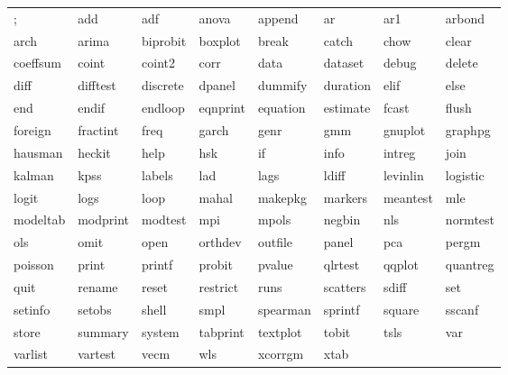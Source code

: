 \begin{tabular}{llllllll}
; & add & adf & anova & append & ar & ar1 & arbond \\
arch & arima & biprobit & boxplot & break & catch & chow & clear \\
coeffsum & coint & coint2 & corr & data & dataset & debug & delete \\
diff & difftest & discrete & dpanel & dummify & duration & elif & else \\
end & endif & endloop & eqnprint & equation & estimate & fcast & flush \\
foreign & fractint & freq & garch & genr & gmm & gnuplot & graphpg \\
hausman & heckit & help & hsk & if & info & intreg & join \\
kalman & kpss & labels & lad & lags & ldiff & levinlin & logistic \\
logit & logs & loop & mahal & makepkg & markers & meantest & mle \\
modeltab & modprint & modtest & mpi & mpols & negbin & nls & normtest \\
ols & omit & open & orthdev & outfile & panel & pca & pergm \\
poisson & print & printf & probit & pvalue & qlrtest & qqplot & quantreg \\
quit & rename & reset & restrict & runs & scatters & sdiff & set \\
setinfo & setobs & shell & smpl & spearman & sprintf & square & sscanf \\
store & summary & system & tabprint & textplot & tobit & tsls & var \\
varlist & vartest & vecm & wls & xcorrgm & xtab & \\
\end{tabular}

